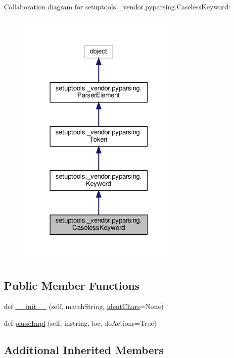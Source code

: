 Collaboration diagram for setuptools.\+\_\+vendor.\+pyparsing.\+Caseless\+Keyword\+:
\nopagebreak
\begin{figure}[H]
\begin{center}
\leavevmode
\includegraphics[width=227pt]{classsetuptools_1_1__vendor_1_1pyparsing_1_1CaselessKeyword__coll__graph}
\end{center}
\end{figure}
\subsection*{Public Member Functions}
\begin{DoxyCompactItemize}
\item 
def \hyperlink{classsetuptools_1_1__vendor_1_1pyparsing_1_1CaselessKeyword_a538dc003e74aa58ef1c945b7f97ed5b6}{\+\_\+\+\_\+init\+\_\+\+\_\+} (self, match\+String, \hyperlink{classsetuptools_1_1__vendor_1_1pyparsing_1_1Keyword_aa4030fb7a4311114af357a36bb59989f}{ident\+Chars}=None)
\item 
def \hyperlink{classsetuptools_1_1__vendor_1_1pyparsing_1_1CaselessKeyword_a784af5de7c8dcbe12c8a14d8320488b0}{parse\+Impl} (self, instring, loc, do\+Actions=True)
\end{DoxyCompactItemize}
\subsection*{Additional Inherited Members}


